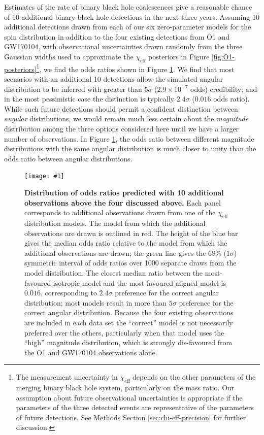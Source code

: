 \documentclass{nature}
\newcommand{\chieff}{\chi_\mathrm{eff}}
\newcommand{\OTwoSigmaIsoAlignedMin}{2.4}
\newcommand{\OTwoOddsIsoAlignedMin}{0.016}
\newcommand{\plotone}[1]{\texttt{[image: \#1]}}
\begin{document}
Estimates of the rate of binary black hole coalescences give a
reasonable chance of 10 additional binary black hole detections in the
next three years\cite{O1-BBH,2016ApJ...833L...1A}.  Assuming 10
additional detections drawn from each of our six zero-parameter models
for the spin distribution in addition to the four existing detections
from O1 and GW170104, with observational uncertainties drawn randomly
from the three Gaussian widths used to approximate the $\chieff$
posteriors in Figure \ref{fig:O1-posteriors}\footnote{The measurement
  uncertainty in $\chieff$ depends on the other parameters of the
  merging binary black hole system, particularly on the mass ratio.
  Our assumption about future observational uncertainties is
  appropriate if the parameters of the three detected events are
  representative of the parameters of future detections. See Methods
  Section \ref{sec:chi-eff-precision} for further discussion.}, we
find the odds ratios shown in Figure \ref{fig:O2-predictions}.  We
find that most scenarios with an additional 10 detections allow the
simulated angular distribution to be inferred with greater than
$5\sigma$ ($2.9 \times 10^{-7}$ odds) credibility; and in the most
pessimistic case the distinction is typically
$\OTwoSigmaIsoAlignedMin\sigma$ ($\OTwoOddsIsoAlignedMin$ odds ratio).
While such future detections should permit a confident distinction
between \emph{angular} distributions, we would remain much less
certain about the \emph{magnitude} distribution among the three
options considered here until we have a larger number of
observations\cite{2017arXiv170306869F,2017arXiv170306223G}.  In Figure
\ref{fig:O2-predictions}, the odds ratio between different magnitude
distributions with the same angular distribution is much closer to
unity than the odds ratio between angular distributions.

\begin{figure}
  \plotone{plots/six-way-O2-model-selection}
  \caption{\label{fig:O2-predictions} \textbf{Distribution of odds
      ratios predicted with 10 additional observations above the four
      discussed above.}  Each panel corresponds to additional
    observations drawn from one of the $\chieff$ distribution models.
    The model from which the additional observations are drawn is
    outlined in red.  The height of the blue bar gives the median odds
    ratio relative to the model from which the additional observations
    are drawn; the green line gives the 68\% ($1 \sigma$) symmetric
    interval of odds ratios over 1000 separate draws from the model
    distribution.  The closest median ratio between the most-favoured
    isotropic model and the most-favoured aligned model is
    $\OTwoOddsIsoAlignedMin$, corresponding to
    $\OTwoSigmaIsoAlignedMin\sigma$ preference for the correct angular
    distribution; most models result in more than $5\sigma$ preference
    for the correct angular distribution.  Because the four existing
    observations are included in each data set the ``correct'' model
    is not necessarily preferred over the others, particularly when
    that model uses the ``high'' magnitude distribution, which is
    strongly dis-favoured from the O1 and GW170104 observations
    alone.}
\end{figure}
\end{document}
